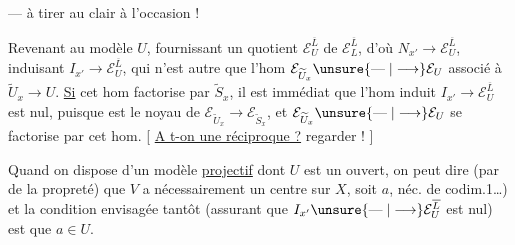 --- à tirer au clair à l'occasion !

Revenant au modèle $U$, fournissant un quotient $\mathcal E_U^{\overline L}$ de $\mathcal E_L^{\overline L}$, d'où $N_{x'}\longrightarrow\mathcal E_U^{\overline L}$, induisant $I_{x'}\longrightarrow\mathcal E_U^{\overline L}$,
qui n'est autre que l'hom  $\mathcal E_{\widetilde U_x}\unsure{\mathrel{\text{---}}|\longrightarrow}\mathcal E_U$ associé à $\widetilde U_x\longrightarrow U$. \uline{Si} cet hom factorise par $\widetilde S_x$, il est immédiat que l'hom induit $I_{x'}\longrightarrow\mathcal E_U^{\overline L}$ est nul, puisque  est le noyau de $\mathcal E_{\widetilde U_x}\longrightarrow\mathcal E_{\widetilde S_x}$, et $\mathcal E_{\widetilde U_x}\unsure{\mathrel{\text{---}}|\longrightarrow}\mathcal E_U$ se factorise par cet hom.
[ \uline{A t-on une réciproque ?} regarder ! ]

Quand on dispose d'un modèle \uline{projectif} dont $U$ est un ouvert, on peut dire (par  de la propreté) que $V$ a nécessairement un centre sur $X$, soit $a$,   néc. de codim.1\ldots) et la condition envisagée tantôt (assurant que $I_{x'}\unsure{\mathrel{\text{---}}|\longrightarrow}\mathcal E_U^{\overline L}$ est nul) est que $a\in U$.
